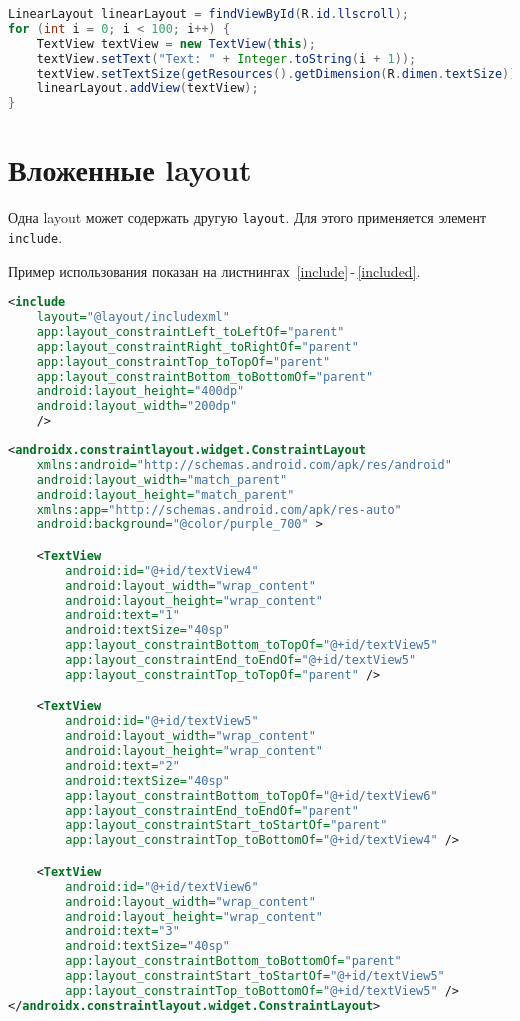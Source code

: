 \begin{lstlisting}[language=Java
	, caption=\leftline{Программное создание ScrollView}
	, label=ScrollView:java
	]
LinearLayout linearLayout = findViewById(R.id.llscroll);
for (int i = 0; i < 100; i++) {
	TextView textView = new TextView(this);
	textView.setText("Text: " + Integer.toString(i + 1));
	textView.setTextSize(getResources().getDimension(R.dimen.textSize));
	linearLayout.addView(textView);
}
\end{lstlisting}

\section{Вложенные layout}
Одна layout может содержать другую \texttt{layout}. Для этого применяется 
элемент \texttt{include}.

Пример использования показан на листнингах~\ref{include}\,-\,\ref{included}.

\begin{lstlisting}[language=XML
	, caption=\leftline{Использование include}
	, label=include
	]
<include
	layout="@layout/includexml"
	app:layout_constraintLeft_toLeftOf="parent"
	app:layout_constraintRight_toRightOf="parent"
	app:layout_constraintTop_toTopOf="parent"
	app:layout_constraintBottom_toBottomOf="parent"
	android:layout_height="400dp"
	android:layout_width="200dp"
	/>
\end{lstlisting}

\begin{lstlisting}[language=XML
	, caption=\leftline{Вложенный файл}
	, label=include
	]
<androidx.constraintlayout.widget.ConstraintLayout
    xmlns:android="http://schemas.android.com/apk/res/android"
    android:layout_width="match_parent"
    android:layout_height="match_parent"
    xmlns:app="http://schemas.android.com/apk/res-auto"
    android:background="@color/purple_700" >

    <TextView
        android:id="@+id/textView4"
        android:layout_width="wrap_content"
        android:layout_height="wrap_content"
        android:text="1"
        android:textSize="40sp"
        app:layout_constraintBottom_toTopOf="@+id/textView5"
        app:layout_constraintEnd_toEndOf="@+id/textView5"
        app:layout_constraintTop_toTopOf="parent" />

    <TextView
        android:id="@+id/textView5"
        android:layout_width="wrap_content"
        android:layout_height="wrap_content"
        android:text="2"
        android:textSize="40sp"
        app:layout_constraintBottom_toTopOf="@+id/textView6"
        app:layout_constraintEnd_toEndOf="parent"
        app:layout_constraintStart_toStartOf="parent"
        app:layout_constraintTop_toBottomOf="@+id/textView4" />

    <TextView
        android:id="@+id/textView6"
        android:layout_width="wrap_content"
        android:layout_height="wrap_content"
        android:text="3"
        android:textSize="40sp"
        app:layout_constraintBottom_toBottomOf="parent"
        app:layout_constraintStart_toStartOf="@+id/textView5"
        app:layout_constraintTop_toBottomOf="@+id/textView5" />
</androidx.constraintlayout.widget.ConstraintLayout>
\end{lstlisting}

